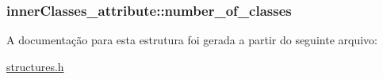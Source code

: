 \subsubsection[{\texorpdfstring{number\+\_\+of\+\_\+classes}{number_of_classes}}]{ inner\+Classes\+\_\+attribute\+::number\+\_\+of\+\_\+classes}\hypertarget{structinnerClasses__attribute_a5025605be4999db69f5cf0309fa1e443}{}\label{structinnerClasses__attribute_a5025605be4999db69f5cf0309fa1e443}


A documentação para esta estrutura foi gerada a partir do seguinte arquivo\+:\begin{DoxyCompactItemize}
\item 
\hyperlink{structures_8h}{structures.\+h}\end{DoxyCompactItemize}
